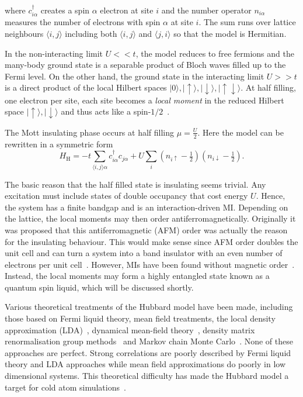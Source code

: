 where \(c^\dagger_{i\alpha}\) creates a spin \(\alpha\) electron at site \(i\) and the number operator \(n_{i\alpha}\) measures the number of electrons with spin \(\alpha\) at site \(i\). The sum runs over lattice neighbours \(\langle i,j \rangle\) including both \(\langle i,j \rangle\) and \(\langle j,i \rangle\) so that the model is Hermitian.

In the non-interacting limit \(U << t\), the model reduces to free fermions and the many-body ground state is a separable product of Bloch waves filled up to the Fermi level. On the other hand, the ground state in the interacting limit \(U >> t\) is a direct product of the local Hilbert spaces \(|0\rangle, |\uparrow\rangle, |\downarrow\rangle, |\uparrow\downarrow\rangle\). At half filling, one electron per site, each site becomes a \emph{local moment} in the reduced Hilbert space \(|\uparrow\rangle, |\downarrow\rangle\) and thus acts like a spin-\(1/2\)~\autocite{hubbardElectronCorrelationsNarrow1964}.

The Mott insulating phase occurs at half filling \(\mu = \tfrac{U}{2}\). Here the model can be rewritten in a symmetric form \[ H_{\mathrm{H}} = -t \sum_{\langle i,j \rangle \alpha} c^\dagger_{i\alpha} c_{j\alpha} + U \sum_i (n_{i\uparrow} - \tfrac{1}{2})(n_{i\downarrow} - \tfrac{1}{2}).\]

The basic reason that the half filled state is insulating seems trivial. Any excitation must include states of double occupancy that cost energy \(U\). Hence, the system has a finite bandgap and is an interaction-driven MI. Depending on the lattice, the local moments may then order antiferromagnetically. Originally it was proposed that this antiferromagnetic (AFM) order was actually the reason for the insulating behaviour. This would make sense since AFM order doubles the unit cell and can turn a system into a band insulator with an even number of electrons per unit cell~\autocite{mottMetalInsulatorTransitions1990}. However, MIs have been found without magnetic order~\autocite{law1TTaS2QuantumSpin2017,ribakGaplessExcitationsGround2017}. Instead, the local moments may form a highly entangled state known as a quantum spin liquid, which will be discussed shortly.

Various theoretical treatments of the Hubbard model have been made, including those based on Fermi liquid theory, mean field treatments, the local density approximation (LDA)~\autocite{slaterMagneticEffectsHartreeFock1951}, dynamical mean-field theory~\autocite{greinerQuantumPhaseTransition2002}, density matrix renormalisation group methods~\autocite{hallbergNewTrendsDensity2006,schollwöckDensitymatrixRenormalizationGroup2005,whiteDensityMatrixFormulation1992} and Markov chain Monte Carlo~\autocite{blankenbeclerMonteCarloCalculations1981,hirschDiscreteHubbardStratonovichTransformation1983,whiteNumericalStudyTwodimensional1989}. None of these approaches are perfect. Strong correlations are poorly described by Fermi liquid theory and LDA approaches while mean field approximations do poorly in low dimensional systems. This theoretical difficulty has made the Hubbard model a target for cold atom simulations~\autocite{mazurenkoColdatomFermiHubbard2017}.

